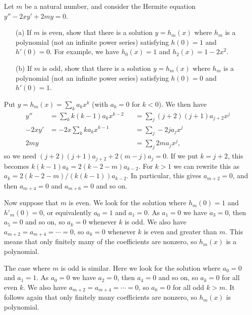 \documentclass[a4paper]{amsart}
\begin{document}
\begin{exercise}\label{ex-hermite}
 Let $m$ be a natural number, and consider the Hermite equation
 $y''-2xy'+2my=0$.
 \begin{itemize}
  \item[(a)] If $m$ is even, show that there is a solution $y=h_m(x)$
   where $h_m$ is a polynomial (not an infinite power series)
   satisfying $h(0)=1$ and $h'(0)=0$.  For example, we have $h_0(x)=1$
   and $h_2(x)=1-2x^2$.
  \item[(b)] If $m$ is odd, show that there is a solution $y=h_m(x)$
   where $h_m$ is a polynomial (not an infinite power series)
   satisfying $h(0)=0$ and $h'(0)=1$.
 \end{itemize}
\end{exercise}
\begin{solution}
 Put $y=h_m(x)=\sum_ka_kx^k$ (with $a_k=0$ for $k<0$).  We then have
 \begin{align*}
  y'' &= \sum_k k(k-1)a_kx^{k-2}
      &&= \sum_j (j+2)(j+1)a_{j+2} x^j \\
  -2xy' &= -2x\sum_k ka_kx^{k-1} 
      &&= \sum_j -2ja_jx^j \\
  2my &&&= \sum_j 2ma_jx^j,
 \end{align*}
 so we need $(j+2)(j+1)a_{j+2}+2(m-j)a_j=0$.  If we put $k=j+2$, this
 becomes $k(k-1)a_k=2(k-2-m)a_{k-2}$.  For $k>1$ we can rewrite this
 as $a_k=2(k-2-m)/(k(k-1))a_{k-2}$.  In particular, this gives $a_{m+2}=0$,
 and then $a_{m+4}=0$ and $a_{m+6}=0$ and so on.

 Now suppose that $m$ is even.  We look for the solution where
 $h_m(0)=1$ and $h'_m(0)=0$, or equivalently $a_0=1$ and $a_1=0$.  As
 $a_1=0$ we have $a_3=0$, then $a_5=0$ and so on, so $a_k=0$ whenever
 $k$ is odd.  We also have $a_{m+2}=a_{m+4}=\dotsb=0$, so $a_k=0$
 whenever $k$ is even and greater than $m$.  This means that only
 finitely many of the coefficients are nonzero, so $h_m(x)$ is a
 polynomial.  

 The case where $m$ is odd is similar.  Here we look for the solution
 where $a_0=0$ and $a_1=1$.  As $a_0=0$ we have $a_2=0$, then $a_4=0$
 and so on, so $a_k=0$ for all even $k$.  We also have
 $a_{m+2}=a_{m+4}=\dotsb=0$, so $a_k=0$ for all odd $k>m$.  It follows
 again that only finitely many coefficients are nonzero, so $h_m(x)$
 is polynomial.
\end{solution}
\end{document}
